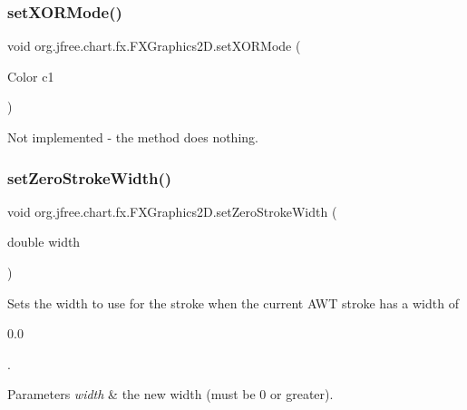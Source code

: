 \subsubsection{\texorpdfstring{set\+X\+O\+R\+Mode()}{setXORMode()}}
{\footnotesize\ttfamily void org.\+jfree.\+chart.\+fx.\+F\+X\+Graphics2\+D.\+set\+X\+O\+R\+Mode (\begin{DoxyParamCaption}\item[{Color}]{c1 }\end{DoxyParamCaption})}

Not implemented -\/ the method does nothing. \mbox{\label{classorg_1_1jfree_1_1chart_1_1fx_1_1_f_x_graphics2_d_a485af8716e9c56d306cffc7e5aaa05f8}} 
\subsubsection{\texorpdfstring{set\+Zero\+Stroke\+Width()}{setZeroStrokeWidth()}}
{\footnotesize\ttfamily void org.\+jfree.\+chart.\+fx.\+F\+X\+Graphics2\+D.\+set\+Zero\+Stroke\+Width (\begin{DoxyParamCaption}\item[{double}]{width }\end{DoxyParamCaption})}

Sets the width to use for the stroke when the current A\+WT stroke has a width of
\begin{DoxyCode}
0.0 
\end{DoxyCode}
 .


\begin{DoxyParams}{Parameters}
{\em width} & the new width (must be 0 or greater). \\
\hline
\end{DoxyParams}
\mbox{\label{classorg_1_1jfree_1_1chart_1_1fx_1_1_f_x_graphics2_d_acddd0092045f44b40877489c00155c94}} 
